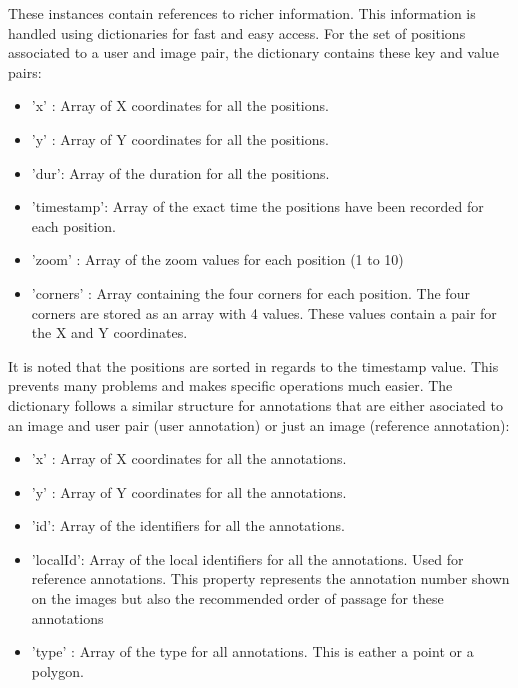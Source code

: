 \documentclass[a4paper,11pt]{report}
\numberwithin{figure}{section} %
\begin{document}
    These instances contain references to richer information.
    This information is handled using dictionaries for fast and easy access.
    For the set of positions associated to a user and image pair, the dictionary contains these key and value pairs:
    \begin{itemize}
        \item[\textbullet] 'x' : Array of X coordinates for all the positions.
        \item[\textbullet] 'y' : Array of Y coordinates for all the positions.
        \item[\textbullet] 'dur': Array of the duration for all the positions.
        \item[\textbullet] 'timestamp': Array of the exact time the positions have been recorded for each position.
        \item[\textbullet] 'zoom' : Array of the zoom values for each position (1 to 10)
        \item[\textbullet] 'corners' : Array containing the four corners for each position.
        The four corners are stored as an array with 4 values.
        These values contain a pair for the X and Y coordinates.
    \end{itemize}

    It is noted that the positions are sorted in regards to the timestamp value.
    This prevents many problems and makes specific operations much easier.
    The dictionary follows a similar structure for annotations that are either asociated to an image and user pair (user annotation) or just an image (reference annotation):
    \begin{itemize}
        \item[\textbullet] 'x' : Array of X coordinates for all the annotations.
        \item[\textbullet] 'y' : Array of Y coordinates for all the annotations.
        \item[\textbullet] 'id': Array of the identifiers for all the annotations.
        \item[\textbullet] 'localId': Array of the local identifiers for all the annotations.
        Used for reference annotations.
        This property represents the annotation number shown on the images but also the recommended order of passage for these annotations
        \item[\textbullet] 'type' : Array of the type for all annotations.
        This is eather a point or a polygon.
    \end{itemize}
\end{document}
